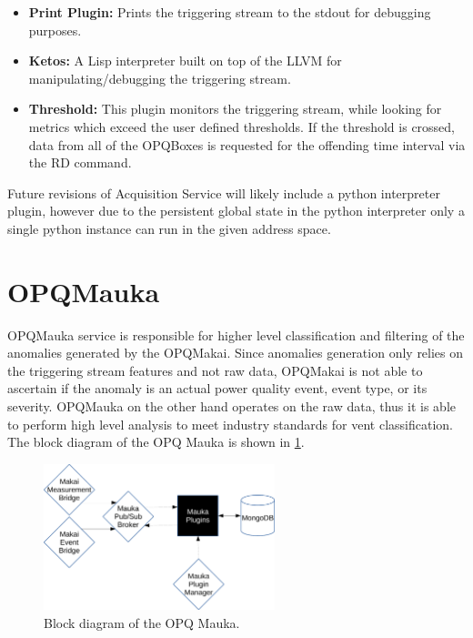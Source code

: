 \begin{itemize}
\item{\textbf{Print Plugin:}} Prints the triggering stream to the stdout for debugging purposes. 
\item{\textbf{Ketos:}} A Lisp interpreter built on top of the LLVM for manipulating/debugging the triggering stream.
\item{\textbf{Threshold:}} This plugin monitors the triggering stream, while looking for metrics which exceed the user defined thresholds. If the threshold is crossed, data from all of the OPQBoxes is requested for the offending time interval via the RD command.
\end{itemize}

Future revisions of Acquisition Service will likely include a python interpreter plugin, however due to the persistent global state in the python interpreter only a single python instance can run in the given address space.

\section{OPQMauka}
OPQMauka service is responsible for higher level classification and filtering of the anomalies generated by the OPQMakai. Since anomalies generation only
relies on the triggering stream features and not raw data, OPQMakai is not able to ascertain if the anomaly is an actual power quality event, event type, or its severity. OPQMauka on the other hand operates on the raw data, thus it is able to perform high level analysis to meet industry standards for vent classification. The block diagram of the OPQ Mauka is shown in \ref{fig:8}.
\begin{figure}[h]
  \begin{center}
  \includegraphics[width=0.6\textwidth]{img/mauka.pdf}
  \end{center}
  \caption{Block diagram of the OPQ Mauka.}
  \label{fig:8}
\end{figure}

